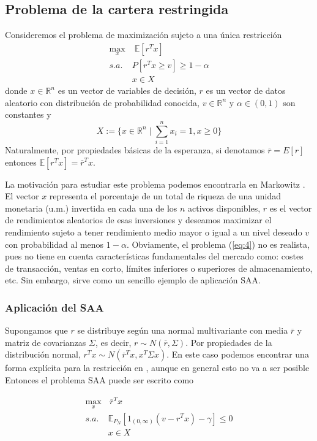 \documentclass[twoside,a4paper,openright,12pt]{book}
\newcommand{\R}{\mathbb{R}}
\newcommand{\E}{\mathbb{E}}
\begin{document}
\subsection{Problema de la cartera restringida}
Consideremos el problema de maximización sujeto a una única restricción
\begin{align*}
\max_{x} &\;\E[r^Tx] \\ 
s.a.\;  &  P[r^Tx\geq v]\geq 1-\alpha \tag{4} \label{eq:4}\\
& x\in X
\end{align*}
donde $x\in\R^n$ es un vector de variables de decisión, $r$ es un vector de datos aleatorio con distribución de probabilidad conocida, $v\in\R^n$ y $\alpha\in(0,1)$ son constantes y
$$
X:=\{x\in\R^n \mid \sum_{i=1}^n x_i=1,x\geq 0\}
$$
Naturalmente, por propiedades básicas de la esperanza, si denotamos $\overline{r}= E[r]$ entonces $\E[r^Tx]=\overline{r}^Tx$.

La motivación para estudiar este problema podemos encontrarla en Markowitz \cite{portfolio}. El vector $x$ representa el porcentaje de un total de riqueza de una unidad monetaria (u.m.) invertida en cada una de los $n$ activos disponibles, $r$ es el vector de rendimientos aleatorios de esas inversiones y deseamos maximizar el rendimiento sujeto a tener rendimiento medio mayor o igual a un nivel deseado $v$ con probabilidad al menos $1-\alpha$. Obviamente, el problema (\ref{eq:4}) no es realista, pues no tiene en cuenta características fundamentales del mercado como: costes de transacción, ventas en corto, límites inferiores o superiores de almacenamiento, etc. Sin embargo, sirve como un sencillo ejemplo de aplicación SAA.

\subsubsection*{Aplicación del SAA}

Supongamos que $r$ se distribuye según una normal multivariante con media $\overline{r}$ y matriz de covarianzas $\Sigma$, es decir, $r\sim N(\overline{r},\Sigma)$. Por propiedades de la distribución normal, $r^Tx \sim N(\overline{r}^Tx,x^T\Sigma x)$. En este caso podemos encontrar una forma explícita para la restricción en \cite{convexop}, aunque en general esto no va a ser posible Entonces el problema SAA puede ser escrito como

\begin{align*}
\max_{x}&\,{ \overline{r}^Tx}  \nonumber\\ 
s.a.\;  & \E_{P_N}[1_{(0,\infty)}(v-r^Tx)  -\gamma]\leq 0\\
& x\in X \nonumber
\end{align*}
\end{document}
